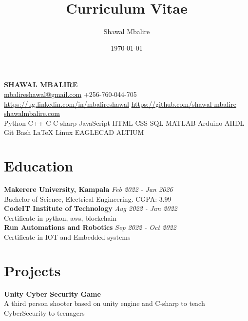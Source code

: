 \documentclass[a4paper]{article}
\title{Curriculum Vitae}
\author{Shawal Mbalire}
\date{\today}
\begin{document}
    {\centering
        \LARGE{\bf SHAWAL MBALIRE} \\
        {\small
        \url{mbalireshawal@gmail.com}\hspace{2em}
        +256-760-044-705\hspace{2em}
        \url{https://ug.linkedin.com/in/mbalireshawal}
        \url{https://github.com/shawal-mbalire} \hspace{2em}
        \url{shawalmbalire.com}\\
        Python C++ C  C-sharp JavaScript
        HTML CSS SQL MATLAB
        Arduino AHDL Git Bash LaTeX Linux
        EAGLECAD ALTIUM}
    }

    \begin{minipage}[t]{0.5\textwidth}

        \section*{\bf Education}
        {\bf Makerere University, Kampala}
        \hfil{\em Feb 2022 - Jan 2026}\\
        Bachelor of Science, Electrical Engineering.
        \hfil CGPA: 3.99\\
        {\bf CodeIT Institute of Technology}
        \hfil{\em Aug 2022 - Jan 2022}\\
        Certificate in python, aws, blockchain\\
        {\bf Run Automations and Robotics}
        \hfil{\em Sep 2022 - Oct 2022}\\
        Certificate in IOT and Embedded systems


        \section*{\bf Projects}

        {\bf Unity Cyber Security Game}\\
        A third person shooter based on unity engine and C-sharp to teach CyberSecurity to teenagers


\end{minipage}
\end{document}
